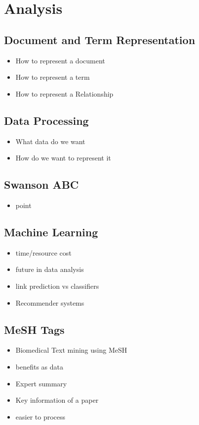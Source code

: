 \documentclass{l4proj}
\begin{document}
\chapter{Analysis}
\section{Document and Term Representation}
\begin{itemize}
    \item How to represent a document
    \item How to represent a term
    \item How to represent a Relationship
\end{itemize}
\section{Data Processing}
\begin{itemize}
    \item What data do we want
    \item How do we want to represent it
\end{itemize}
\section{Swanson ABC}
\begin{itemize}
    \item point
\end{itemize}
\section{Machine Learning}
\begin{itemize}
    \item time/resource cost
    \item future in data analysis
    \item link prediction vs classifiers
    \item Recommender systems
\end{itemize}
\section{MeSH Tags}
\begin{itemize}
    \item Biomedical Text mining using MeSH
    \item benefits as data 
    \item Expert summary
    \item Key information of a paper
    \item easier to process
\end{itemize}
\end{document}
